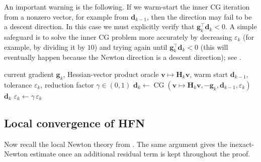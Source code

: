 An important warning is the following. If we warm-start the inner CG
iteration from a nonzero vector, for example from $\mathbf{d}_{k-1}$, then the
direction may fail to be a descent direction. In this case we must explicitly
verify that $\mathbf{g}_k^{\top}\mathbf{d}_k<0$. A simple safeguard is to
solve the inner CG problem more accurately by decreasing $\varepsilon_k$
(for example, by dividing it by $10$) and trying again until
$\mathbf{g}_k^{\top}\mathbf{d}_k<0$ (this will eventually
happen because the Newton direction is a descent direction); see .

\begin{algorithm}[ht]
  \caption{Warm-start safeguard for the inner CG solve}
  \label{alg:ch6-hfn-warm-start}
  \begin{algorithmic}
    \REQUIRE current gradient $\mathbf{g}_k$, Hessian-vector product oracle
    $\mathbf{v}\mapsto \mathbf{H}_k\mathbf{v}$, warm start $\mathbf{d}_{k-1}$,
    tolerance $\varepsilon_k$, reduction factor $\gamma\in(0,1)$
      \STATE $\mathbf{d}_k\gets
      \operatorname{CG}(\mathbf{v}\mapsto \mathbf{H}_k\mathbf{v},
      -\mathbf{g}_k,\mathbf{d}_{k-1},\varepsilon_k)$
        \RETURN $\mathbf{d}_k$
      \ENDIF
      \STATE $\varepsilon_k\gets \gamma\,\varepsilon_k$
    \ENDWHILE
  \end{algorithmic}
\end{algorithm}

\subsection{Local convergence of HFN}
\label{sec:ch6-hfn-local}
Now recall the local Newton theory from . The
same argument gives the inexact-Newton estimate once an additional residual
term is kept throughout the proof.

